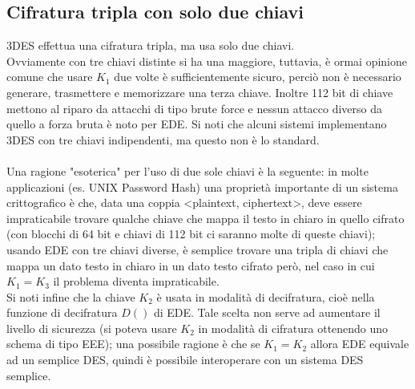 \subsection{Cifratura tripla con solo due chiavi}
3DES effettua una cifratura tripla, ma usa solo due chiavi. \\
Ovviamente con tre chiavi distinte si ha una maggiore, tuttavia, è ormai opinione comune che usare $K_{1}$ due
volte è sufficientemente sicuro, perciò non è necessario generare, trasmettere e memorizzare una terza chiave. Inoltre 112 bit di chiave mettono al riparo da attacchi di tipo brute force e nessun attacco diverso da quello a forza bruta è noto per EDE. Si noti che alcuni sistemi implementano 3DES con tre chiavi indipendenti, ma questo non è lo standard.\\ \\
Una ragione "esoterica" per l'uso di due sole chiavi è la seguente: in molte applicazioni (es. UNIX Password Hash) una proprietà importante di un sistema crittografico è che, data una coppia <plaintext, ciphertext>, deve essere impraticabile trovare qualche chiave che mappa il testo in chiaro in quello cifrato (con blocchi di 64 bit e chiavi di 112 bit ci saranno molte di queste chiavi); usando EDE con tre chiavi diverse, è semplice trovare una tripla di chiavi che mappa un dato testo in chiaro in un dato testo cifrato però, nel caso in cui $K_{1} = K_{3}$ il problema diventa impraticabile.\\
Si noti infine che la chiave $K_{2}$ è usata in modalità di decifratura, cioè nella funzione di decifratura
$D()$ di EDE. Tale scelta non serve ad aumentare il livello di sicurezza (si poteva usare $K_{2}$ in modalità di
cifratura ottenendo uno schema di tipo EEE); una possibile ragione è che se $K_{1} = K_{2}$ allora EDE
equivale ad un semplice DES, quindi è possibile interoperare con un sistema DES semplice.
